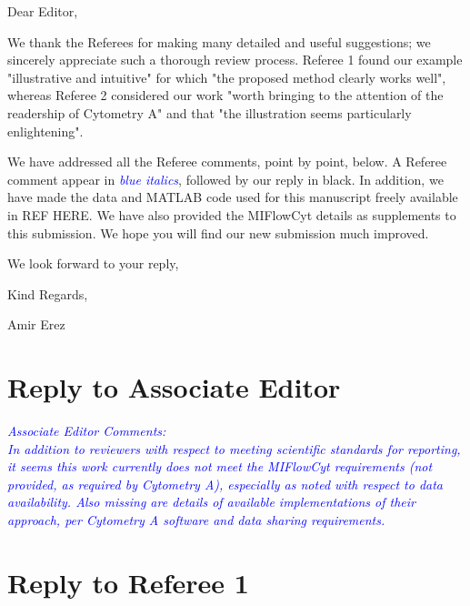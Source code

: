 \documentclass[letter,11pt,draft]{article}
\newcommand{\re}[1]{\emph{\textcolor{blue}{#1}}}
\begin{document}




Dear Editor,

\bigskip

We thank the Referees for making many detailed and useful suggestions; we sincerely appreciate such a thorough review process.
Referee 1 found our example "illustrative and intuitive" for which "the proposed method clearly works well", whereas Referee 2 considered our work "worth bringing to the attention of the readership of Cytometry A" and that "the illustration seems particularly enlightening".

\bigskip
We have addressed all the Referee comments, point by point, below. A Referee comment appear in \re{blue italics}, followed by our reply in black. In addition, we have made the data and MATLAB code used for this manuscript freely available in REF HERE. We have also provided the MIFlowCyt details as supplements to this submission. We hope you will find our new submission much improved.

\bigskip
\bigskip
\bigskip
We look forward to your reply,

\bigskip
Kind Regards,

\bigskip
\bigskip
\bigskip
Amir Erez

\newpage
\section*{Reply to Associate Editor}

\re{
Associate Editor Comments:
\\
In addition to reviewers with respect to meeting scientific standards for reporting, it seems this work currently does not meet the MIFlowCyt requirements (not provided, as required by Cytometry A), especially as noted  with respect to data availability. Also missing are details of available implementations of their approach, per  Cytometry A software and data sharing requirements.}



\newpage

\section*{Reply to Referee 1}
\end{document}
